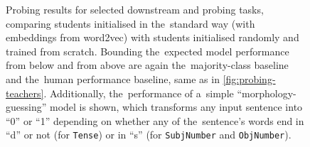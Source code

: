 \documentclass[bsc,frontabs,singlespacing,parskip,deptreport]{infthesis}
\begin{document}
{{    \begin{figure}[h!tb]
      \centering
      \cprotect\caption{Probing results for selected downstream and probing tasks, comparing students initialised in the~standard way (with embeddings from word2vec) with students initialised randomly and trained from scratch. Bounding the~expected model performance from below and from above are again the~majority-class baseline and the~human performance baseline, same as in \autoref{fig:probing-teachers}.
      Additionally, the~performance of a~simple ``morphology-guessing'' model is shown, which transforms any input sentence into ``0'' or ``1'' depending on whether any of the~sentence's words end in ``d'' or not (for \verb|Tense|) or in ``s'' (for \verb|SubjNumber| and \verb|ObjNumber|).}
      \label{fig:probing-students-scratch-selected}
    \end{figure}

}}
\end{document}
